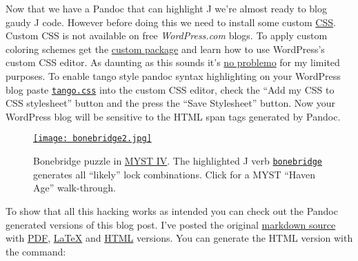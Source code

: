 Now that we have a Pandoc that can highlight J we're almost ready to
blog gaudy J code. However before doing this we need to install some
\captionsetup[floatingfigure]{labelformat=empty}
custom \href{http://www.htmldog.com/guides/cssbeginner/}{CSS}. Custom
CSS is not available on free \emph{WordPress.com} blogs. To apply custom
coloring schemes get the
\href{http://en.support.wordpress.com/custom-design/}{custom package}
and learn how to use WordPress's custom CSS editor. As daunting as this
sounds it's \href{http://www.youtube.com/watch?v=4QWfrxYt9DQ}{no
problemo} for my limited purposes. To enable tango style pandoc syntax
highlighting on your WordPress blog paste 
\href{https://github.com/bakerjd99/jacks/blob/master/jodliterate/tango.css}{\texttt{tango.css}}
into the custom CSS editor, check the ``Add my CSS to CSS stylesheet'' button and
the press the ``Save Stylesheet'' button. Now your WordPress blog will
be sensitive to the HTML span tags generated by Pandoc.

\captionsetup[figure]{labelformat=empty}
\begin{SCfigure}
\centering
\href{http://www.youtube.com/watch?v=GW8zcbr9Zko}{\texttt{[image: bonebridge2.jpg]}}
\caption[Bonebridge puzzle in
\href{http://en.wikipedia.org/wiki/Myst\_IV:\_Revelation}{MYST IV}]{Bonebridge puzzle in
\href{http://en.wikipedia.org/wiki/Myst\_IV:\_Revelation}{MYST IV}.
The highlighted J verb \href{https://github.com/bakerjd99/jacks/blob/master/jodliterate/bonebridge.ijs}{\texttt{bonebridge}} generates all ``likely'' lock combinations.
Click for a MYST ``Haven Age'' walk-through.}
\label{fig:3202X0}
\end{SCfigure}

To show that all this hacking works as intended you can check out the
Pandoc generated versions of this blog post. I've posted the original
\href{https://github.com/bakerjd99/jacks/blob/master/jodliterate/PJHighlight.markdown}{markdown source} with
\href{https://github.com/bakerjd99/jacks/blob/master/jodliterate/PJHighlight.pdf}{PDF},
\href{https://github.com/bakerjd99/jacks/blob/master/jodliterate/PJHighlight.tex}{\LaTeX} and
\href{https://github.com/bakerjd99/jacks/blob/master/jodliterate/PJHighlight.html}{HTML} versions. You can generate the
HTML version with the command:

